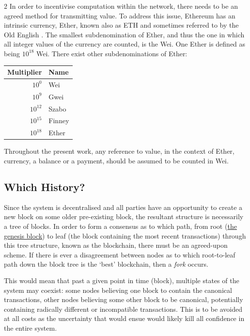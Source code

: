 \documentclass[9pt,oneside]{amsart}
\begin{document}
\begin{multicols}{2}
In order to incentivise computation within the network, there needs to be an agreed method for transmitting value. To address this issue, Ethereum has an intrinsic currency, Ether, known also as {\small ETH} and sometimes referred to by the Old English \DH{}. The smallest subdenomination of Ether, and thus the one in which all integer values of the currency are counted, is the Wei. One Ether is defined as being $10^{18}$ Wei. There exist other subdenominations of Ether:
\par
\begin{center}
\begin{tabular}{rl}
\toprule
Multiplier & Name \\
\midrule
$10^0$ & Wei \\
$10^9$ & Gwei \\
$10^{12}$ & Szabo \\
$10^{15}$ & Finney \\
$10^{18}$ & Ether \\
\bottomrule
\end{tabular}
\end{center}
\par

Throughout the present work, any reference to value, in the context of Ether, currency, a balance or a payment, should be assumed to be counted in Wei.

\subsection{Which History?}

Since the system is decentralised and all parties have an opportunity to create a new block on some older pre-existing block, the resultant structure is necessarily a tree of blocks. In order to form a consensus as to which path, from root (\hyperlink{Genesis_Block}{the genesis block}) to leaf (the block containing the most recent transactions) through this tree structure, known as the blockchain, there must be an agreed-upon scheme. If there is ever a disagreement between nodes as to which root-to-leaf path down the block tree is the `best' blockchain, then a \textit{fork} occurs.

This would mean that past a given point in time (block), multiple states of the system may coexist: some nodes believing one block to contain the canonical transactions, other nodes believing some other block to be canonical, potentially containing radically different or incompatible transactions. This is to be avoided at all costs as the uncertainty that would ensue would likely kill all confidence in the entire system.


\end{multicols}
\end{document}
